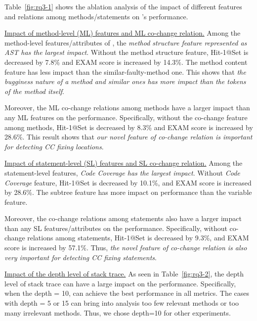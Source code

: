 Table~\ref{fig:rq3-1} shows the ablation analysis of the impact of
different features and relations among methods/statements on
{\tool}'s performance.

\underline{Impact of method-level (ML) features and ML co-change relation.}
Among the method-level features/attributes of {\tool}, the {\it method
structure feature represented as AST has the largest impact}. Without
the method structure feature, Hit-1@Set is decreased by 7.8\% and
EXAM score is increased by 14.3\%.
The method content feature has less impact than the
similar-faulty-method one. This shows that {\em the bugginess nature
of a method and similar ones has more impact than the tokens of the
method itself}.

Moreover, the ML co-change relations among methods have a larger
impact than any ML features on the performance. Specifically,
without the co-change feature among methods, Hit-1@Set is decreased
by 8.3\% and EXAM score is increased by 28.6\%.
This result shows that {\em our novel feature of co-change relation is
important for detecting CC fixing locations}.


\underline{Impact of statement-level (SL) features and SL co-change relation.}
Among the statement-level features, {\it Code Coverage
has the largest impact}. Without {\it Code Coverage} feature,
Hit-1@Set is decreased by 10.1\%, and EXAM score is increased by 28.6\%.
The subtree feature has more impact on performance than the
variable feature.

Moreover, the co-change relations among statements also have a larger
impact than any SL features/attributes on the performance. Specifically,
without co-change relations among statements, Hit-1@Set is decreased
by 9.3\%, and EXAM score is increased by 57.1\%. Thus, {\em the novel
feature of co-change relation is also very important for detecting
CC fixing statements}.




\underline{Impact of the depth level of stack trace.} 
As seen in Table~\ref{fig:rq3-2}, the depth level of stack trace can
have a large impact on the performance. Specifically, when the depth =
10, {\tool} can achieve the best performance in all metrics. The cases
with depth = 5 or 15 can bring into analysis too few relevant methods
or too many irrelevant methods. Thus, we chose depth=10 for other
experiments.

